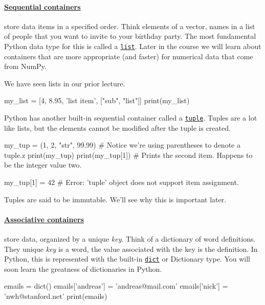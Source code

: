 \documentclass[12pt,letterpaper,twoside]{article}
\begin{document}
\paragraph{\href{https://en.wikipedia.org/wiki/List_(abstract_data_type)}{Sequential containers}} 
store data items in a specified order.
Think elements of a vector, names in a list of people that you want to
invite to your birthday party. The most fundamental Python data type for
this is called a \href{https://docs.python.org/3/tutorial/datastructures.html#more-on-lists}{\texttt{list}}. 
Later in the course we will learn about
containers that are more appropriate (and faster) for numerical data
that come from NumPy.

We have seen lists in our prior lecture.
\begin{python}
my_list = [4, 8.95, 'list item', ["sub", "list"]]
print(my_list)
\end{python}

Python has another built-in sequential container called a
\href{https://docs.python.org/3/tutorial/datastructures.html#tuples-and-sequences}{\texttt{tuple}}. 
Tuples are a lot like lists, but the elements cannot be modified after the tuple is created.

\begin{python}
my_tup = (1, 2, "str", 99.99)  # Notice we're using parentheses to denote a tuple.z
print(my_tup)
print(my_tup[1]) # Prints the second item. Happens to be the integer value two.

my_tup[1] = 42   # Error: 'tuple' object does not support item assignment.
\end{python}

Tuples are said to be immutable. We'll see why this is important later.

\paragraph{\href{https://en.wikipedia.org/wiki/Associative_array}{Associative containers}}
store data, organized by a unique
\emph{key}. Think of a dictionary of word definitions. They unique
\emph{key} is a word, the value associated with the key is the
definition. In Python, this is represented with the built-in
\href{https://docs.python.org/3/tutorial/datastructures.html#dictionaries}{\texttt{dict}} 
or Dictionary type. You will soon learn the greatness of
dictionaries in Python.

\begin{python}
emails = dict()
emails['andreas'] = 'andreas@mail.com'
emails['nick'] = 'nwh@stanford.net'
print(emails)
\end{python}
\end{document}
